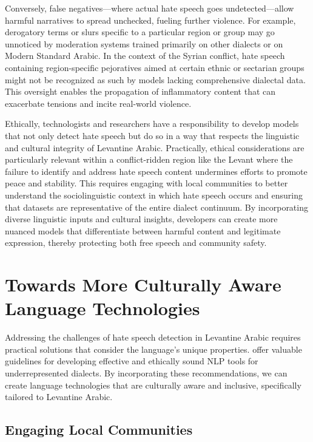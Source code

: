 \documentclass[11pt]{article}
\begin{document}
Conversely, false negatives—where actual hate speech goes undetected—allow harmful narratives to spread unchecked, fueling further violence. For example, derogatory terms or slurs specific to a particular region or group may go unnoticed by moderation systems trained primarily on other dialects or on Modern Standard Arabic. In the context of the Syrian conflict, hate speech containing region-specific pejoratives aimed at certain ethnic or sectarian groups might not be recognized as such by models lacking comprehensive dialectal data. This oversight enables the propagation of inflammatory content that can exacerbate tensions and incite real-world violence.

Ethically, technologists and researchers have a responsibility to develop models that not only detect hate speech but do so in a way that respects the linguistic and cultural integrity of Levantine Arabic. Practically, ethical considerations are particularly relevant within a conflict-ridden region like the Levant where the failure to identify and address hate speech content undermines efforts to promote peace and stability. This requires engaging with local communities to better understand the sociolinguistic context in which hate speech occurs and ensuring that datasets are representative of the entire dialect continuum. By incorporating diverse linguistic inputs and cultural insights, developers can create more nuanced models that differentiate between harmful content and legitimate expression, thereby protecting both free speech and community safety.


\section{Towards More Culturally Aware Language Technologies}

Addressing the challenges of hate speech detection in Levantine Arabic requires practical solutions that consider the language's unique properties. \citet{bergman2022responsiblenaturallanguageannotation} offer valuable guidelines for developing effective and ethically sound NLP tools for underrepresented dialects. By incorporating these recommendations, we can create language technologies that are culturally aware and inclusive, specifically tailored to Levantine Arabic.


\subsection{Engaging Local Communities}
\end{document}
